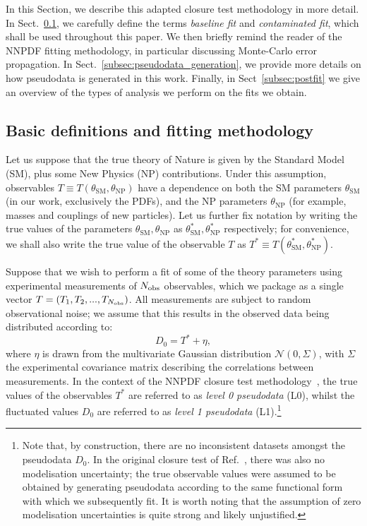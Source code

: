 \documentclass[withindex,glossary]{cam-thesis}
\begin{document}
In this Section, we describe this adapted closure test methodology in more detail. In Sect.~\ref{subsec:contamination_definition}, we carefully define the terms \textit{baseline fit} and \textit{contaminated fit}, which shall be used throughout this paper. We then briefly remind the reader of the NNPDF fitting methodology, in particular discussing Monte-Carlo error propagation. In Sect.~\ref{subsec:pseudodata_generation}, we provide more details on how pseudodata is generated in this work. Finally, in Sect~\ref{subsec:postfit} we give an overview of the types of analysis we perform on the fits we obtain.

\subsection{Basic definitions and fitting methodology}
\label{subsec:contamination_definition}
Let us suppose that the true theory of Nature is given by the Standard Model (SM), plus some New Physics (NP) contributions. Under this assumption, observables $T \equiv T(\theta_{\text{SM}}, \theta_{\text{NP}})$ have a dependence on both the SM parameters $\theta_{\text{SM}}$ (in our work, exclusively the PDFs), and the NP parameters $\theta_{\text{NP}}$ (for example, masses and couplings of new particles). Let us further fix notation by writing the true values of the parameters $\theta_{\text{SM}}, \theta_{\text{NP}}$ as $\theta_{\text{SM}}^*, \theta_{\text{NP}}^*$ respectively; for convenience, we shall also write the true value of the observable $T$ as $T^* \equiv T(\theta_{\text{SM}}^*, \theta_{\text{NP}}^*)$.

Suppose that we wish to perform a fit of some of the theory parameters using experimental measurements of $N_{\rm obs}$ observables, which we package as a single vector $T = (T_1, T_2,..., T_{N_{\rm obs}})$. All measurements are subject to random observational noise; we assume that this results in the observed data being distributed according to:
\begin{equation}
\label{eq:observed_data}
D_0 = T^* + \eta,
\end{equation}
where $\eta$ is drawn from the multivariate Gaussian distribution $\mathcal{N}(0,\Sigma)$, with $\Sigma$ the experimental covariance matrix describing the correlations between measurements. In the context of the NNPDF closure test methodology~\cite{NNPDF:2014otw}, the true values of the observables $T^*$ are referred to as \textit{level 0 pseudodata} (L0), whilst the fluctuated values $D_0$ are referred to as \textit{level 1 pseudodata} (L1).\footnote{Note that, by construction, there are no inconsistent
datasets amongst the pseudodata $D_0$. In the original closure test of Ref.~\cite{NNPDF:2014otw}, there was also no modelisation uncertainty; the true observable values were assumed to be obtained by generating pseudodata according to the same functional form with which we subsequently fit. It is worth noting that the assumption of zero modelisation uncertainties
is quite strong and likely unjustified.}  
\end{document}
